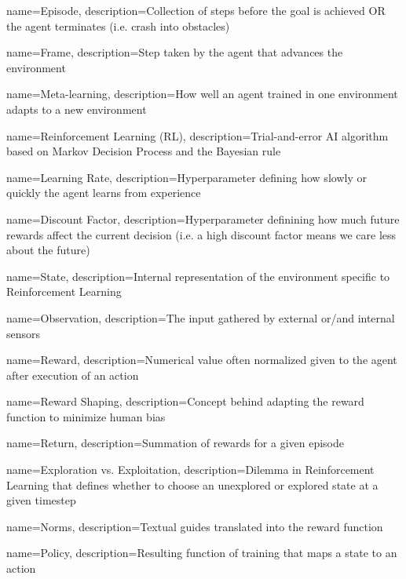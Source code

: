 {
    name=Episode,
    description={Collection of steps before the goal is achieved OR the agent 
            terminates (i.e. crash into obstacles)}
}

{
    name=Frame,
    description={Step taken by the agent that advances the environment}
}

{
    name=Meta-learning,
    description={How well an agent trained in one environment 
        adapts to a new environment}
}

{
    name=Reinforcement Learning (RL),
    description={Trial-and-error AI algorithm based on Markov Decision Process 
            and the Bayesian rule}
}

{
    name=Learning Rate,
    description={Hyperparameter defining how slowly or quickly the agent 
            learns from experience}
}

{
    name=Discount Factor,
    description={Hyperparameter definining how much future rewards 
    affect the current decision (i.e. a high discount factor means we care less 
    about the future)}
}

{
    name=State,
    description={Internal representation of the environment specific to Reinforcement Learning}
}

{
    name=Observation,
    description={The input gathered by external or/and internal sensors}
}

{
    name=Reward,
    description={Numerical value often normalized given to the agent after execution of an action}
}

{
    name=Reward Shaping,
    description={Concept behind adapting the reward function to minimize human bias}
}

{
    name=Return,
    description={Summation of rewards for a given episode}
}

{
    name=Exploration vs. Exploitation,
    description={Dilemma in Reinforcement Learning that defines whether to choose 
    an unexplored or explored state at a given timestep}
}


{
    name=Norms,
    description={Textual guides translated into the reward function}
}

{
    name=Policy,
    description={Resulting function of training that maps a state to an action}
}


